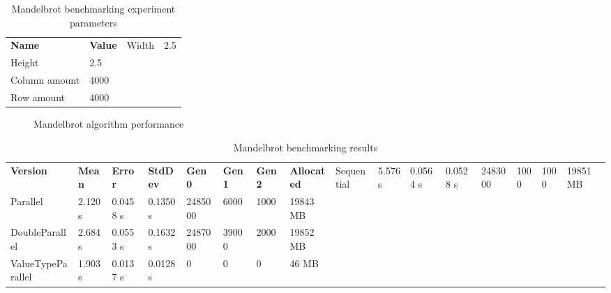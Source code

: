 \begin{table}[!ht]
    \centering
    \caption{Mandelbrot benchmarking experiment parameters}
		\label{tab: MandelbrotParameters}
    \begin{tabular}{p{3cm}p{3cm}}
			\toprule
			\bfseries Name 	&
			\bfseries Value &
			\midrule
			Width & 2.5 \\
			Height & 2.5 \\
			Column amount & 4000 \\ 
			Row amount  & 4000 \\	
			\bottomrule
    \end{tabular}
\end{table}

\begin{figure}[!ht]
\centering
{}
\caption{Mandelbrot algorithm performance}
\label{fig: MandelbrotPerformance}
\end{figure}

\begin{sidewaystable}[!ht]
    \centering
    \caption{Mandelbrot benchmarking results}
		\label{tab: MandelbrotBenchmarking}
    \begin{tabular}{lp{3cm}p{1.5cm}p{1.5cm}p{2cm}p{2cm}p{2cm}p{2cm}}
			\toprule
			\bfseries Version 	&
			\bfseries Mean    	&
			\bfseries Error	    &
			\bfseries StdDev	  &
			\bfseries Gen 0	    &
			\bfseries Gen 1	    &
			\bfseries Gen 2	    &
			\bfseries Allocated &
			\midrule 
			Sequential & 5.576 s & 0.0564 s & 0.0528 s & 2483000 & 1000 & 1000 & 19851 MB \\ 
			Parallel & 2.120 s & 0.0458 s & 0.1350 s & 2485000 & 6000 & 1000 & 19843 MB \\ 
			DoubleParallel & 2.684 s & 0.0553 s & 0.1632 s & 2487000 & 39000 & 2000 & 19852 MB \\ 
			ValueTypeParallel & 1.903 s & 0.0137 s & 0.0128 s & 0 & 0 & 0 & 46 MB \\ 
			\bottomrule
    \end{tabular}
\end{sidewaystable}

